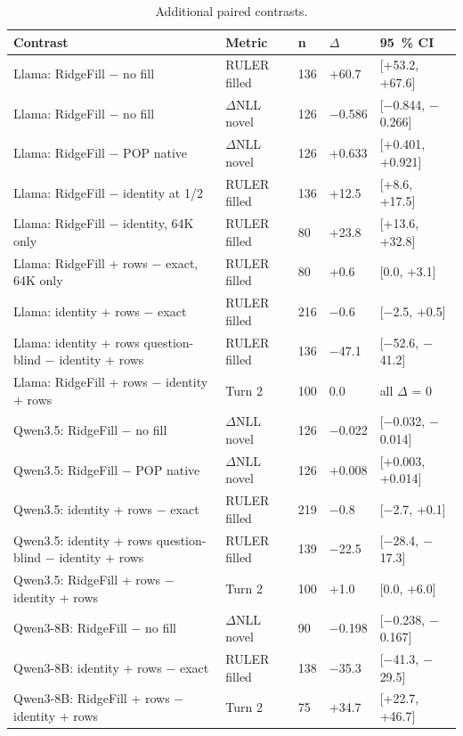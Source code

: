 \documentclass[11pt]{article}
\begin{document}
\begin{table}[H]
\centering
\caption{Additional paired contrasts.}\label{tab:B.1}
\small
\setlength{\tabcolsep}{4pt}
\begin{tabularx}{\linewidth}{>{\raggedright\arraybackslash\hsize=1.000\hsize}Xllll}
\toprule
Contrast & Metric & n & $\Delta$ & 95~\% CI \\
\midrule
Llama: RidgeFill $-$ no fill & RULER filled & 136 & +60.7 & [+53.2, +67.6] \\
Llama: RidgeFill $-$ no fill & $\Delta$NLL novel & 126 & $-$0.586 & [$-$0.844, $-$0.266] \\
Llama: RidgeFill $-$ POP native & $\Delta$NLL novel & 126 & +0.633 & [+0.401, +0.921] \\
Llama: RidgeFill $-$ identity at 1/\allowbreak{}2 & RULER filled & 136 & +12.5 & [+8.6, +17.5] \\
Llama: RidgeFill $-$ identity, 64K only & RULER filled & 80 & +23.8 & [+13.6, +32.8] \\
Llama: RidgeFill + rows $-$ exact, 64K only & RULER filled & 80 & +0.6 & [0.0, +3.1] \\
Llama: identity + rows $-$ exact & RULER filled & 216 & $-$0.6 & [$-$2.5, +0.5] \\
Llama: identity + rows question-blind $-$ identity + rows & RULER filled & 136 & $-$47.1 & [$-$52.6, $-$41.2] \\
Llama: RidgeFill + rows $-$ identity + rows & Turn 2 & 100 & 0.0 & all $\Delta$ = 0 \\
Qwen3.5: RidgeFill $-$ no fill & $\Delta$NLL novel & 126 & $-$0.022 & [$-$0.032, $-$0.014] \\
Qwen3.5: RidgeFill $-$ POP native & $\Delta$NLL novel & 126 & +0.008 & [+0.003, +0.014] \\
Qwen3.5: identity + rows $-$ exact & RULER filled & 219 & $-$0.8 & [$-$2.7, +0.1] \\
Qwen3.5: identity + rows question-blind $-$ identity + rows & RULER filled & 139 & $-$22.5 & [$-$28.4, $-$17.3] \\
Qwen3.5: RidgeFill + rows $-$ identity + rows & Turn 2 & 100 & +1.0 & [0.0, +6.0] \\
Qwen3-8B: RidgeFill $-$ no fill & $\Delta$NLL novel & 90 & $-$0.198 & [$-$0.238, $-$0.167] \\
Qwen3-8B: identity + rows $-$ exact & RULER filled & 138 & $-$35.3 & [$-$41.3, $-$29.5] \\
Qwen3-8B: RidgeFill + rows $-$ identity + rows & Turn 2 & 75 & +34.7 & [+22.7, +46.7] \\
\bottomrule
\end{tabularx}
\end{table}
\end{document}
